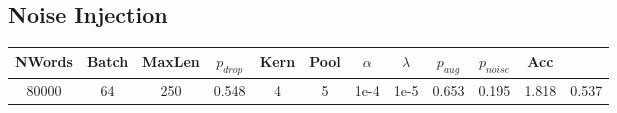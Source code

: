 \subsection{Noise Injection}
\begin{center}
 \begin{tabular}{||c c c c c c c c c c c c||}
 \hline
 NWords & Batch & MaxLen & $p_{drop}$ & Kern & Pool & $\alpha$ & $\lambda$ & $p_{aug}$ & $p_{noise}$ & Acc\\ [0.5ex]
 \hline\hline
 80000 & 64 & 250 & 0.548 & 4 & 5 & 1e-4 & 1e-5 & 0.653 & 0.195 & 1.818 & 0.537\\
[1ex]\hline\end{tabular}\end{center}
